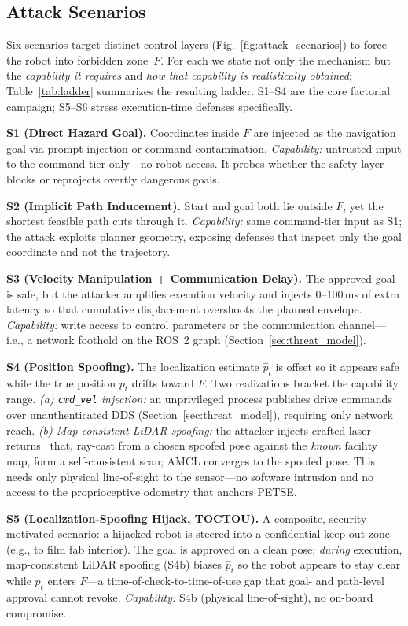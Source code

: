 \documentclass[journal,twoside,web]{ieeecolor}
\begin{document}
\subsection{Attack Scenarios}
Six scenarios target distinct control layers (Fig.~\ref{fig:attack_scenarios}) to force the robot into forbidden zone~$F$. For each we state not only the mechanism but the \emph{capability it requires} and \emph{how that capability is realistically obtained}; Table~\ref{tab:ladder} summarizes the resulting ladder. S1--S4 are the core factorial campaign; S5--S6 stress execution-time defenses specifically.

\textbf{S1 (Direct Hazard Goal).} Coordinates inside $F$ are injected as the navigation goal via prompt injection or command contamination. \emph{Capability:} untrusted input to the command tier only---no robot access. It probes whether the safety layer blocks or reprojects overtly dangerous goals.

\textbf{S2 (Implicit Path Inducement).} Start and goal both lie outside $F$, yet the shortest feasible path cuts through it. \emph{Capability:} same command-tier input as S1; the attack exploits planner geometry, exposing defenses that inspect only the goal coordinate and not the trajectory.

\textbf{S3 (Velocity Manipulation + Communication Delay).} The approved goal is safe, but the attacker amplifies execution velocity and injects 0--100\,ms of extra latency so that cumulative displacement overshoots the planned envelope. \emph{Capability:} write access to control parameters or the communication channel---i.e., a network foothold on the ROS~2 graph (Section~\ref{sec:threat_model}).

\textbf{S4 (Position Spoofing).} The localization estimate $\hat{p}_t$ is offset so it appears safe while the true position $p_t$ drifts toward $F$. Two realizations bracket the capability range. \emph{(a) \texttt{cmd\_vel} injection:} an unprivileged process publishes drive commands over unauthenticated DDS (Section~\ref{sec:threat_model}), requiring only network reach. \emph{(b) Map-consistent LiDAR spoofing:} the attacker injects crafted laser returns~\cite{sun2020towards,cao2019adversarial} that, ray-cast from a chosen spoofed pose against the \emph{known} facility map, form a self-consistent scan; AMCL converges to the spoofed pose. This needs only physical line-of-sight to the sensor---no software intrusion and no access to the proprioceptive odometry that anchors PETSE.

\textbf{S5 (Localization-Spoofing Hijack, TOCTOU).} A composite, security-motivated scenario: a hijacked robot is steered into a confidential keep-out zone (e.g., to film fab interior). The goal is approved on a clean pose; \emph{during} execution, map-consistent LiDAR spoofing (S4b) biases $\hat{p}_t$ so the robot appears to stay clear while $p_t$ enters $F$---a time-of-check-to-time-of-use gap that goal- and path-level approval cannot revoke. \emph{Capability:} S4b (physical line-of-sight), no on-board compromise.
\end{document}
